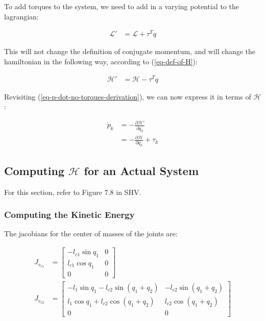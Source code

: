 \documentclass{article}
\begin{document}
To add torques to the system, we need to add in a varying potential to the lagrangian:

\begin{align}
	\mathcal{L}' & = \mathcal{L} + \tau^T q \label{eq-L-with-torques}
\end{align}

This will not change the definition of conjugate momentum, and will change the hamiltonian
	in the following way, according to (\ref{eq-def-of-H}):

\begin{align}
	\mathcal{H}' & = \mathcal{H} - \tau^T q \label{eq-H-with-torques}
\end{align}

Revisiting (\ref{eq-p-dot-no-torques-derivation}), we can now express it in terms of $\mathcal{H}$:

\begin{align}
	\dot{p}_k & = - \frac {\partial \mathcal{H}'}{\partial q_k} \nonumber \\
	& =  - \frac {\partial \mathcal{H}}{\partial q_k} + \tau_k \label{eq-p-dot-torques}
\end{align}

\subsection{Computing $\mathcal{H}$ for an Actual System}

For this section, refer to Figure $7.8$ in SHV.

\subsubsection{Computing the Kinetic Energy}

The jacobians for the center of masses of the joints are:

\begin{align}
J_{v_{c1}} & = \left[ \begin{matrix}
	- l_{c1} \sin q_1 & 0 \\
	l_{c1} \cos q_1 & 0 \\
	0 & 0 \end{matrix} \right] \label{eq-jacobian-cm-1} \\
J_{v_{c2}} & = \left[ \begin{matrix}
	- l_1 \sin q_1 - l_{c2} \sin (q_1 + q_2) &  - l_{c2} \sin (q_1 + q_2)\\
	l_1 \cos q_1 + l_{c2} \cos (q_1 + q_2) & l_{c2} \cos (q_1 + q_2)  \\
	0 & 0 \end{matrix} \right] \label{eq-jacobian-cm-2}
\end{align}
\end{document}
